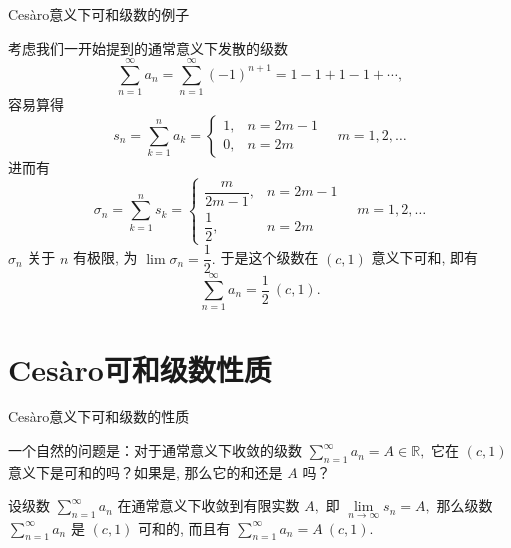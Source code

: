 
\begin{frame}{Cesàro意义下可和级数的例子}

\begin{eg}
{\smaller[1]
考虑我们一开始提到的通常意义下发散的级数
$$\sum\limits_{n=1}^{\infty} a_n = \sum\limits_{n=1}^{\infty} (-1)^{n+1}  = 1 - 1 + 1 - 1 + \cdots,$$
容易算得
$$s_n = \sum\limits_{k=1}^{n} a_k = \begin{cases}
    1, & n = 2m - 1 \\
    0, & n = 2m
\end{cases} \quad m = 1, 2, \dots$$
进而有
$$\sigma_n = \sum\limits_{k=1}^n s_k = \begin{cases}
  \dfrac{m}{2m - 1}, & n = 2m - 1\\
  \dfrac{1}{2}, & n = 2m
  \end{cases} \quad m = 1, 2, \dots$$
}
$\sigma_n$ 关于 $n$ 有极限, 为 $\lim\limits \sigma_n = \dfrac{1}{2}.$ 于是这个级数在 $(c, 1)$ 意义下可和, 即有
$$\sum\limits_{n=1}^{\infty} a_n = \dfrac{1}{2}~(c, 1).$$
\end{eg}

\end{frame}


\section[性质]{Cesàro可和级数性质}


\begin{frame}{Cesàro意义下可和级数的性质}

一个自然的问题是：对于通常意义下收敛的级数 $\sum\limits_{n=1}^{\infty} a_n = A \in \mathbb{R},$ 它在 $(c, 1)$ 意义下是可和的吗？如果是, 那么它的和还是 $A$ 吗？

\pause
\vspace*{2em}

\begin{prop}
设级数 $\sum\limits_{n=1}^{\infty} a_n$ 在通常意义下收敛到有限实数 $A,$ 即 $\lim\limits_{n \to \infty} s_n = A,$ 那么级数 $\sum\limits_{n=1}^{\infty} a_n$ 是 $(c, 1)$ 可和的, 而且有 $\sum\limits_{n=1}^{\infty} a_n = A~(c, 1).$
\end{prop}

\end{frame}

